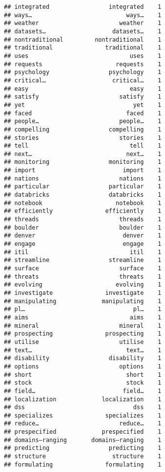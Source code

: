 \documentclass[]{article}
\begin{document}
\begin{verbatim}
## integrated                 integrated    1
## ways…                           ways…    1
## weather                       weather    1
## datasets…                   datasets…    1
## nontraditional         nontraditional    1
## traditional               traditional    1
## uses                             uses    1
## requests                     requests    1
## psychology                 psychology    1
## critical…                   critical…    1
## easy                             easy    1
## satisfy                       satisfy    1
## yet                               yet    1
## faced                           faced    1
## people…                       people…    1
## compelling                 compelling    1
## stories                       stories    1
## tell                             tell    1
## next…                           next…    1
## monitoring                 monitoring    1
## import                         import    1
## nations                       nations    1
## particular                 particular    1
## databricks                 databricks    1
## notebook                     notebook    1
## efficiently               efficiently    1
## threads                       threads    1
## boulder                       boulder    1
## denver                         denver    1
## engage                         engage    1
## itil                             itil    1
## streamline                 streamline    1
## surface                       surface    1
## threats                       threats    1
## evolving                     evolving    1
## investigate               investigate    1
## manipulating             manipulating    1
## pl…                               pl…    1
## aims                             aims    1
## mineral                       mineral    1
## prospecting               prospecting    1
## utilise                       utilise    1
## text…                           text…    1
## disability                 disability    1
## options                       options    1
## short                           short    1
## stock                           stock    1
## field…                         field…    1
## localization             localization    1
## dss                               dss    1
## specializes               specializes    1
## reduce…                       reduce…    1
## prespecified             prespecified    1
## domains–ranging       domains–ranging    1
## predicting                 predicting    1
## structure                   structure    1
## formulating               formulating    1

\end{verbatim}
\end{document}
